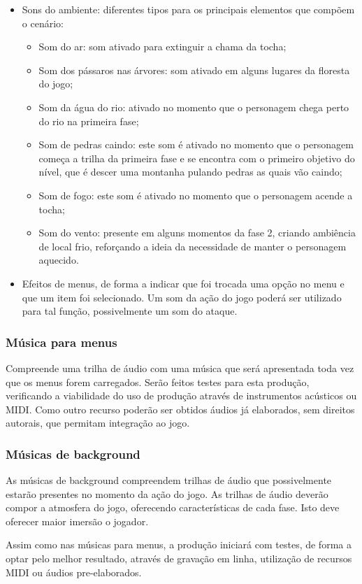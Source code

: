 \begin{itemize}
\item Sons do ambiente: diferentes tipos para os principais elementos que
 compõem o cenário:

\begin{itemize}
\item Som do ar: som ativado para extinguir a chama da tocha;
\item Som dos pássaros nas árvores: som ativado em alguns lugares 
da floresta do jogo;
\item Som da água do rio: ativado no momento que o personagem chega 
perto do rio na primeira fase;
\item Som de pedras caindo: este som é ativado no momento que o personagem 
começa a trilha da primeira fase e se encontra com o primeiro objetivo do 
nível, que é descer uma montanha pulando pedras as quais vão caindo;
\item Som de fogo: este som é ativado no momento que o personagem 
acende a tocha;
\item Som do vento: presente em alguns momentos da fase 2, criando 
ambiência de local frio, reforçando a ideia da necessidade de manter
 o personagem aquecido.
\end{itemize}

\item Efeitos de menus, de forma a indicar que foi trocada uma opção no 
menu e que um item foi selecionado. Um som da ação do jogo poderá ser
 utilizado para tal função, possivelmente um som do ataque.
 
\end{itemize}

\subsubsection{Música para menus}
Compreende uma trilha de áudio com uma música que será apresentada toda
 vez que os menus forem carregados. Serão feitos testes para esta produção, 
verificando a viabilidade do uso de produção através de instrumentos
 acústicos ou MIDI. Como outro recurso poderão ser obtidos áudios já
 elaborados, sem direitos autorais, que permitam integração ao jogo.

\subsubsection{Músicas de background}
As músicas de background compreendem trilhas de áudio que possivelmente
 estarão presentes no momento da ação do jogo. As trilhas de áudio 
deverão compor a atmosfera do jogo, oferecendo características de 
cada fase. Isto deve oferecer maior imersão o jogador.

Assim como nas músicas para menus, a produção iniciará com testes, de 
forma a optar pelo melhor resultado, através de gravação em linha,
 utilização de recursos MIDI ou áudios pre-elaborados.